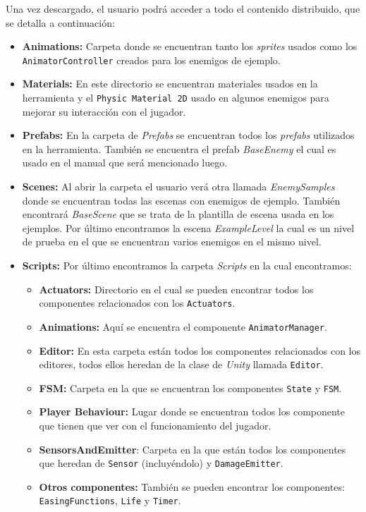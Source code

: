 Una vez descargado, el usuario podrá acceder a todo el contenido distribuido, que se detalla a continuación:\\
\begin{itemize}
\item \textbf{Animations:} Carpeta donde se encuentran tanto los \textit{sprites} usados como los \texttt{AnimatorController} creados para los enemigos de ejemplo.
\item \textbf{Materials:} En este directorio se encuentran materiales usados en la herramienta y el \texttt{Physic Material 2D} usado en algunos enemigos para mejorar su interacción con el jugador.
\item \textbf{Prefabs:} En la carpeta de \textit{Prefabs} se encuentran todos los \textit{prefabs} utilizados en la herramienta. También se encuentra el prefab \textit{BaseEnemy} el cual es usado en el manual que será mencionado luego.
\item \textbf{Scenes:} Al abrir la carpeta el usuario verá otra llamada \textit{EnemySamples} donde se encuentran todas las escenas con enemigos de ejemplo. También encontrará \textit{BaseScene} que se trata de la plantilla de escena usada en los ejemplos. Por último encontramos la escena \textit{ExampleLevel} la cual es un nivel de prueba en el que se encuentran varios enemigos en el mismo nivel.
\item \textbf{Scripts:} Por último encontramos la carpeta \textit{Scripts} en la cual encontramos:
	\begin{itemize}
	\item \textbf{Actuators:} Directorio en el cual se pueden encontrar todos los componentes relacionados con los \texttt{Actuators}.
	\item \textbf{Animations:} Aquí se encuentra el componente \texttt{AnimatorManager}.
	\item \textbf{Editor:} En esta carpeta están todos los componentes relacionados con los editores, todos ellos heredan de la clase de \textit{Unity} llamada \texttt{Editor}.
	\item \textbf{FSM:} Carpeta en la que se encuentran los componentes \texttt{State} y \texttt{FSM}.
	\item \textbf{Player Behaviour:} Lugar donde se encuentran todos los componente que tienen que ver con el funcionamiento del jugador.
	\item \textbf{SensorsAndEmitter}: Carpeta en la que están todos los componentes que heredan de \texttt{Sensor} (incluyéndolo) y \texttt{DamageEmitter}.
	\item \textbf{Otros componentes:} También se pueden encontrar los componentes: \texttt{EasingFunctions}, \texttt{Life} y \texttt{Timer}.
	\end{itemize}
\end{itemize}

